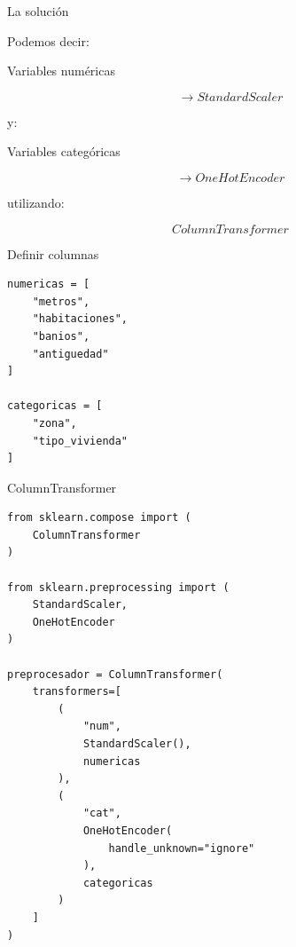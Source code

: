 \documentclass[aspectratio=169,11pt]{beamer}
\begin{document}

\begin{frame}{La solución}

Podemos decir:

\begin{center}

Variables numéricas
\end{center}

\[
\rightarrow
StandardScaler
\]

y:

\begin{center}

Variables categóricas
\end{center}

\[
\rightarrow
OneHotEncoder
\]

utilizando:

\[
\boxed{
ColumnTransformer
}
\]

\end{frame}


\begin{frame}[fragile]{Definir columnas}

\begin{lstlisting}
numericas = [
    "metros",
    "habitaciones",
    "banios",
    "antiguedad"
]

categoricas = [
    "zona",
    "tipo_vivienda"
]
\end{lstlisting}

\end{frame}


\begin{frame}[fragile]{ColumnTransformer}

\begin{lstlisting}
from sklearn.compose import (
    ColumnTransformer
)

from sklearn.preprocessing import (
    StandardScaler,
    OneHotEncoder
)

preprocesador = ColumnTransformer(
    transformers=[
        (
            "num",
            StandardScaler(),
            numericas
        ),
        (
            "cat",
            OneHotEncoder(
                handle_unknown="ignore"
            ),
            categoricas
        )
    ]
)
\end{lstlisting}

\end{frame}
\end{document}
